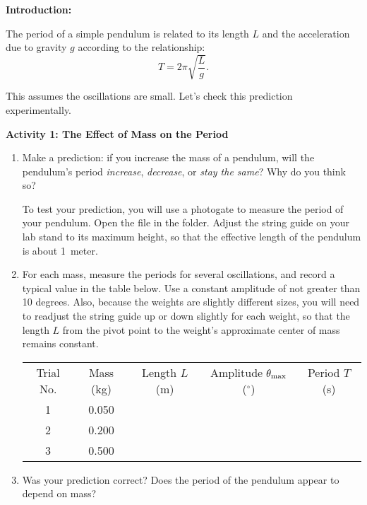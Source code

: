 \bigskip
\textbf{Introduction:}

The period of a simple pendulum is related to its length $L$ and the acceleration due to gravity $g$ according to the relationship:
\begin{equation}
T=2\pi \sqrt{\frac{L}{g}}.
\end{equation}

This assumes the oscillations are small. Let's check this prediction experimentally. 

\bigskip
\textbf{Activity 1: The Effect of Mass on the Period} 

\begin{enumerate}[labparts]

\item Make a prediction: if you increase the mass of a pendulum, will the pendulum's period \textit{increase}, \textit{decrease}, or \textit{stay the same}?  Why do you think so?
\answerspace{0.8in}

To test your prediction, you will use a photogate to measure the period of your pendulum.  
Open the file  in the \filename{\coursefolder} folder.  
Adjust the string guide on your lab stand to its maximum height, so that the effective length of the pendulum is about 1~meter. 

\item For each mass, measure the periods for several oscillations, and record a typical value in the table below.  Use a constant amplitude of not greater than 10 degrees.  Also, because the weights are slightly different sizes, you will need to readjust the string guide up or down slightly for each weight, so that the length $L$ from the pivot point to the weight's approximate center of mass remains constant.  

\begin{center}
{\renewcommand{\arraystretch}{1.8}
\begin{tabular}{|c|c|c|c|c|} \hline 
Trial No. & Mass (kg) & Length $L$ (m) & Amplitude $\theta_{\rm max}$ ($^\circ$) & Period $T$ (s) \\ 
\hhline{|=|=|=|=|=|}
1 & 0.050 & & & \\ \hline 
2 & 0.200 & & & \\ \hline 
3 & 0.500 & & & \\ \hline 
\end{tabular} }
\end{center}

\item Was your prediction correct?  Does the period of the pendulum appear to depend on mass?
\answerspace{0.8in}

\end{enumerate}

